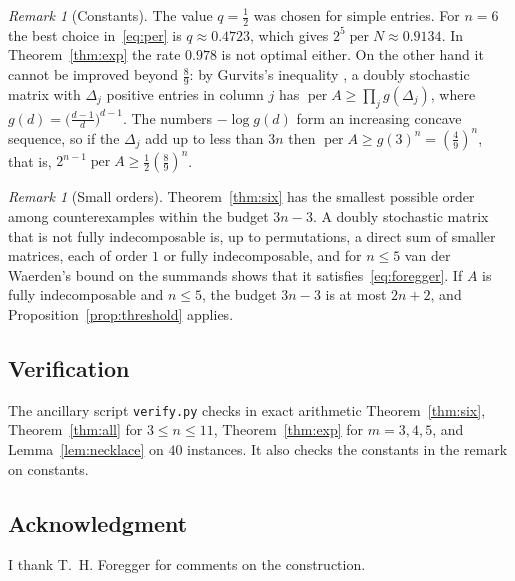 \documentclass[11pt]{amsart}
\theoremstyle{remark}
\newtheorem{remark}[theorem]{Remark}
\DeclareMathOperator{\per}{per}
\newcommand{\half}{\tfrac12}
\begin{document}
\begin{remark}[Constants]
The value $q=\half$ was chosen for simple entries. For $n=6$ the best choice
in~\eqref{eq:per} is $q\approx0.4723$, which gives
$2^{5}\per N\approx0.9134$. In Theorem~\ref{thm:exp} the rate $0.978$ is not
optimal either. On the other hand it cannot be improved beyond $\frac89$: by
Gurvits's inequality \cite{Gurvits,LaurentSchrijver}, a doubly stochastic
matrix with $\Delta_j$ positive entries in column $j$ has
$\per A\ge\prod_j g(\Delta_j)$, where
$g(d)=\bigl(\frac{d-1}{d}\bigr)^{d-1}$. The numbers $-\log g(d)$ form an
increasing concave sequence, so if the $\Delta_j$ add up to less than $3n$
then $\per A\ge g(3)^n=(\frac49)^n$, that is,
$2^{n-1}\per A\ge\half(\frac89)^n$.
\end{remark}

\begin{remark}[Small orders]\label{rem:small}
Theorem~\ref{thm:six} has the smallest possible order among counterexamples
within the budget $3n-3$. A doubly stochastic matrix that is not fully
indecomposable is, up to permutations, a direct sum of smaller matrices, each of
order $1$ or fully indecomposable, and for $n\le5$ van der Waerden's bound on
the summands shows that it satisfies~\eqref{eq:foregger}. If $A$ is fully
indecomposable and $n\le5$, the budget $3n-3$ is at most $2n+2$, and
Proposition~\ref{prop:threshold} applies.
\end{remark}

\subsection*{Verification}
The ancillary script \texttt{verify.py} checks in exact arithmetic
Theorem~\ref{thm:six}, Theorem~\ref{thm:all} for $3\le n\le11$,
Theorem~\ref{thm:exp} for $m=3,4,5$, and Lemma~\ref{lem:necklace} on $40$
instances. It also checks the constants in the remark on constants.

\subsection*{Acknowledgment}
I thank T.~H. Foregger for comments on the construction.
\end{document}
